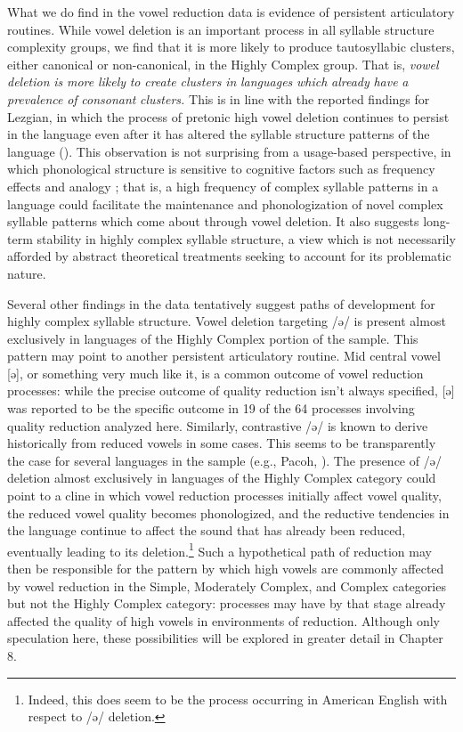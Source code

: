   What we do find in the vowel reduction data is evidence of persistent articulatory routines. While vowel deletion is an important process in all syllable structure complexity groups, we find that it is more likely to produce tautosyllabic clusters, either canonical or non-canonical, in the Highly Complex group. That is, \textit{vowel} \textit{deletion} \textit{is} \textit{more} \textit{likely} \textit{to} \textit{create} \textit{clusters} \textit{in} \textit{languages} \textit{which} \textit{already} \textit{have} \textit{a} \textit{prevalence} \textit{of} \textit{consonant} \textit{clusters.} This is in line with the reported findings for Lezgian, in which the process of pretonic high vowel deletion continues to persist in the language even after it has altered the syllable structure patterns of the language (\citealt{ChitoranBabaliyeva2007}). This observation is not surprising from a usage-based perspective, in which phonological structure is sensitive to cognitive factors such as frequency effects and analogy \citep{Bybee2001}; that is, a high frequency of complex syllable patterns in a language could facilitate the maintenance and phonologization of novel complex syllable patterns which come about through vowel deletion. It also suggests long-term stability in highly complex syllable structure, a view which is not necessarily afforded by abstract theoretical treatments seeking to account for its problematic nature.

  Several other findings in the data tentatively suggest paths of development for highly complex syllable structure. Vowel deletion targeting /ə/ is present almost exclusively in languages of the Highly Complex portion of the sample. This pattern may point to another persistent articulatory routine. Mid central vowel [ə], or something very much like it, is a common outcome of vowel reduction processes: while the precise outcome of quality reduction isn’t always specified, [ə] was reported to be the specific outcome in 19 of the 64 processes involving quality reduction analyzed here. Similarly, contrastive /ə/ is known to derive historically from reduced vowels in some cases. This seems to be transparently the case for several languages in the sample (e.g., Pacoh, \citealt{Alves2000}). The presence of /ə/ deletion almost exclusively in languages of the Highly Complex category could point to a cline in which  vowel reduction processes initially affect vowel quality,  the reduced vowel quality becomes phonologized, and  the reductive tendencies in the language continue to affect the sound that has already been reduced, eventually leading to its deletion.\footnote{ \textrm{Indeed, this does seem to be the process occurring in American English with respect to /ə/ deletion.}} Such a hypothetical path of reduction may then be responsible for the pattern by which high vowels are commonly affected by vowel reduction in the Simple, Moderately Complex, and Complex categories but not the Highly Complex category: processes may have by that stage already affected the quality of high vowels in environments of reduction. Although only speculation here, these possibilities will be explored in greater detail in Chapter 8.

